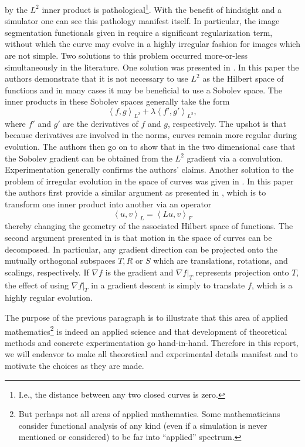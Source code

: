     by the \(L^2\) inner product is pathological\footnote{I.e., the distance
    between any two closed curves is zero.}. With the benefit of hindsight
    and a simulator one can see this pathology manifest itself. In
    particular, the image segmentation functionals given in \citep{Caselles:GAC}
    require a significant regularization term, without which the curve
    may evolve in a highly irregular fashion for images which are not simple.
    Two solutions to this problem occurred more-or-less simultaneously
    in the literature. One solution was presented in \citep{Sundaramoorthi:SAC}.
    In this paper the authors demonstrate that it is not necessary to use 
    \(L^2\) as the Hilbert space of functions and in many cases it may be beneficial
    to use a Sobolev space. The inner products in these Sobolev spaces generally
    take the form
    \[
        \left< f, g \right>_{L^2} + \lambda \left< f', g' \right>_{L^2},
    \]
    where \(f'\) and \(g'\) are the derivatives of \(f\) and \(g\), respectively.
    The upshot is that because derivatives are involved in the norms, curves
    remain more regular during evolution. The authors then go on to show
    that in the two dimensional case that the Sobolev gradient can be
    obtained from the \(L^2\) gradient via a convolution. Experimentation
    generally confirms the authors' claims. Another solution to the
    problem of irregular evolution in the space of curves was given in
    \citep{Charpiat:2005}. In this paper the authors first provide
    a similar argument as presented in \citep{Sundaramoorthi:SAC},
    which is to transform one inner product into another via an
    operator
    \[
        \left< u, v \right>_L = \left< L u, v \right>_F
    \]
    thereby changing the geometry of the associated Hilbert space of
    functions. The second argument presented in \citep{Charpiat:2005}
    is that motion in the space of curves can be decomposed. In particular,
    any gradient direction can be projected onto the mutually orthogonal
    subspaces \(T, R\) or \(S\) which are translations, rotations, and
    scalings, respectively. If \(\nabla f\) is the gradient and 
    \(\left. \nabla f \right|_T\) represents projection onto \(T\),
    the effect of using \(\left. \nabla f \right|_T\) in a gradient
    descent is simply to translate \(f\), which is a highly regular
    evolution.

    The purpose of the previous paragraph is to illustrate that this
    area of applied 
    mathematics\footnote{But perhaps not all areas of applied mathematics. Some mathematicians
                            consider functional analysis of any kind (even if a simulation
                            is never mentioned or considered) to be far into ``applied'' spectrum.} 
    is indeed an applied science and that 
    development of theoretical methods and concrete experimentation go 
    hand-in-hand. Therefore in this report, we will endeavor to make
    all theoretical and experimental details manifest and to motivate
    the choices as they are made.

